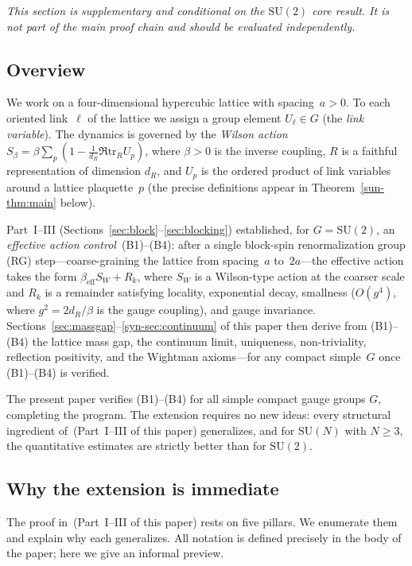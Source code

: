 \documentclass[11pt]{article}
\theoremstyle{definition}
\newcommand{\SU}{\mathrm{SU}}
\newcommand{\tr}{\mathrm{tr}}
\begin{document}
\emph{This section is supplementary and conditional on the
$\SU(2)$ core result.  It is not part of the main proof chain
and should be evaluated independently.}

\subsection{Overview}\label{sun-sec:intro}

We work on a four-dimensional hypercubic lattice with
spacing~$a>0$.  To each oriented link~$\ell$ of the
lattice we assign a group element $U_\ell\in G$
(the \emph{link variable}).  The dynamics is governed by
the \emph{Wilson action}
$S_\beta=\beta\sum_p(1-\frac{1}{d_R}\Re\tr_R U_p)$,
where $\beta>0$ is the inverse coupling, $R$ is a
faithful representation of dimension $d_R$, and
$U_p$ is the ordered product of link variables around a
lattice plaquette~$p$ (the precise definitions appear in
Theorem~\ref{sun-thm:main} below).

Part~I--III (Sections~\ref{sec:block}--\ref{sec:blocking}) established, for
$G=\SU(2)$, an \emph{effective action
control}~(B1)--(B4): after a single block-spin
renormalization group (RG) step---coarse-graining the
lattice from spacing~$a$ to~$2a$---the effective action
takes the form $\beta_{\mathrm{eff}}S_W+R_k$, where
$S_W$ is a Wilson-type action at the coarser scale and
$R_k$ is a remainder satisfying locality, exponential
decay, smallness ($O(g^4)$, where $g^2=2d_R/\beta$ is
the gauge coupling), and gauge invariance.  Sections~\ref{sec:massgap}--\ref{syn-sec:continuum}
of this paper then derive from (B1)--(B4)
the lattice mass gap, the
continuum limit, uniqueness, non-triviality, reflection
positivity, and the Wightman axioms---for any compact
simple~$G$ once (B1)--(B4) is verified.

The present paper verifies (B1)--(B4) for all simple
compact gauge groups $G$, completing the program.
The extension requires no new ideas: every structural
ingredient of~(Part~I--III of this paper) generalizes, and for
$\SU(N)$ with $N\ge 3$, the quantitative estimates
are strictly better than for $\SU(2)$.

\subsection{Why the extension is immediate}

The proof in~(Part~I--III of this paper) rests on five pillars.
We enumerate them and explain why each generalizes.
All notation is defined precisely in the body of the
paper; here we give an informal preview.
\end{document}
